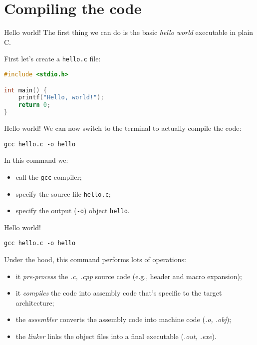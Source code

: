 \section{Compiling the code}
\begin{frame}[fragile]{Hello world!}
    The first thing we can do is the basic \textit{hello world} executable in plain C.

    First let's create a \texttt{hello.c} file:
\begin{lstlisting}[language=C]
#include <stdio.h>

int main() {
    printf("Hello, world!");
    return 0;
} \end{lstlisting}
\end{frame}

\begin{frame}[fragile]{Hello world!}
    We can now switch to the terminal to actually compile the code:

    \begin{lstlisting}
gcc hello.c -o hello \end{lstlisting}

In this command we:
\begin{itemize}
    \item call the \texttt{gcc} compiler;
    \item specify the source file \texttt{hello.c};
    \item specify the output (\texttt{-o}) object \texttt{hello}.
\end{itemize}
\end{frame}

\begin{frame}[fragile]{Hello world!}
    \begin{lstlisting}
gcc hello.c -o hello \end{lstlisting}
    
    Under the hood, this command performs lots of operations:
    \begin{itemize}
        \item it \emph{pre-process} the \textit{.c, .cpp} source code (e.g., header and macro expansion);
        \item it \emph{compiles} the code into assembly code that's specific to the target architecture;
        \item the \emph{assembler} converts the assembly code into machine code (\textit{.o, .obj});
        \item the \emph{linker} links the object files into a final executable (\textit{.out, .exe}).
    \end{itemize}
\end{frame}


